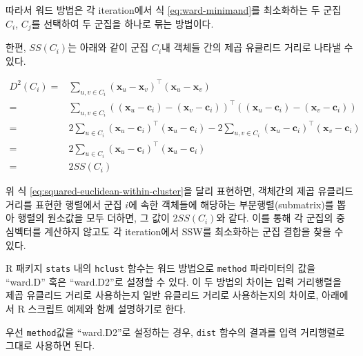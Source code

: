 \documentclass[]{book}
\newenvironment{Shaded}{\begin{snugshade}}{\end{snugshade}}
\newcommand{\DataTypeTok}[1]{\textcolor[rgb]{0.13,0.29,0.53}{#1}}
\newcommand{\DecValTok}[1]{\textcolor[rgb]{0.00,0.00,0.81}{#1}}
\newcommand{\KeywordTok}[1]{\textcolor[rgb]{0.13,0.29,0.53}{\textbf{#1}}}
\newcommand{\NormalTok}[1]{#1}
\newcommand{\OperatorTok}[1]{\textcolor[rgb]{0.81,0.36,0.00}{\textbf{#1}}}
\newcommand{\StringTok}[1]{\textcolor[rgb]{0.31,0.60,0.02}{#1}}
\begin{document}
따라서 워드 방법은 각 iteration에서 식 \eqref{eq:ward-minimand}를 최소화하는 두 군집 \(C_i\), \(C_j\)를 선택하여 두 군집을 하나로 묶는 방법이다.

한편, \(SS(C_i)\)는 아래와 같이 군집 \(C_i\)내 객체들 간의 제곱 유클리드 거리로 나타낼 수 있다.

\begin{equation}
\begin{split}
D^2(C_i) =& \sum_{u, v \in C_i} (\mathbf{x}_u - \mathbf{x}_v)^\top (\mathbf{x}_u - \mathbf{x}_v)\\
=& \sum_{u, v \in C_i} \left((\mathbf{x}_u - \mathbf{c}_i) - (\mathbf{x}_v - \mathbf{c}_i)\right)^\top \left((\mathbf{x}_u - \mathbf{c}_i) - (\mathbf{x}_v - \mathbf{c}_i)\right)\\
=& 2 \sum_{u \in C_i} (\mathbf{x}_u - \mathbf{c}_i)^\top (\mathbf{x}_u - \mathbf{c}_i) - 2 \sum_{u, v \in C_i} (\mathbf{x}_u - \mathbf{c}_i)^\top (\mathbf{x}_v - \mathbf{c}_i)\\
=& 2 \sum_{u \in C_i} (\mathbf{x}_u - \mathbf{c}_i)^\top (\mathbf{x}_u - \mathbf{c}_i)\\
=& 2 SS(C_i)
\end{split}
\label{eq:squared-euclidean-within-cluster}
\end{equation}

위 식 \eqref{eq:squared-euclidean-within-cluster}을 달리 표현하면, 객체간의 제곱 유클리드 거리를 표현한 행렬에서 군집 \(i\)에 속한 객체들에 해당하는 부분행렬(submatrix)를 뽑아 행렬의 원소값을 모두 더하면, 그 값이 \(2 SS(C_i)\)와 같다. 이를 통해 각 군집의 중심벡터를 계산하지 않고도 각 iteration에서 SSW를 최소화하는 군집 결합을 찾을 수 있다.

R 패키지 \texttt{stats} 내의 \texttt{hclust} 함수는 워드 방법으로 \texttt{method} 파라미터의 값을 ``ward.D'' 혹은 ``ward.D2''로 설정할 수 있다. 이 두 방법의 차이는 입력 거리행렬을 제곱 유클리드 거리로 사용하는지 일반 유클리드 거리로 사용하는지의 차이로, 아래에서 R 스크립트 예제와 함께 설명하기로 한다.

우선 \texttt{method}값을 ``ward.D2''로 설정하는 경우, \texttt{dist} 함수의 결과를 입력 거리행렬로 그대로 사용하면 된다.

\begin{Shaded}
\end{Shaded}
\end{document}
